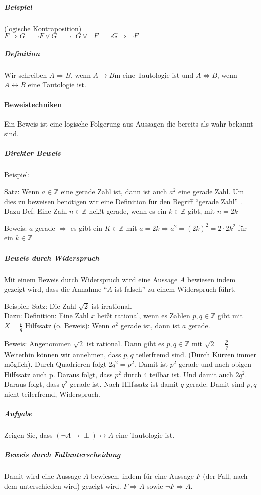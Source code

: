 \documentclass[a4paper]{scrartcl}
\begin{document}
\subparagraph{Beispiel} (logische Kontraposition)\\
$F \Rightarrow G = \neg F \vee G = \neg \neg G \vee \neg F = \neg G \Rightarrow \neg F$

\subparagraph{Definition}
Wir schreiben $A\Rightarrow B$, wenn $A\rightarrow B$m eine Tautologie ist und $A \Leftrightarrow B$, wenn $A\leftrightarrow B$ eine Tautologie ist.


\paragraph{Beweistechniken}
Ein Beweis ist eine logische Folgerung aus Aussagen die bereits als wahr bekannt sind.
\subparagraph{Direkter Beweis}
Beispiel:

Satz: Wenn $a\in \mathbb{Z}$ eine gerade Zahl ist, dann ist auch $a^2$ eine gerade Zahl. Um dies zu beweisen benötigen wir eine Definition für den Begriff "`gerade Zahl"' . Dazu Def:
Eine Zahl $n\in \mathbb{Z}$ heißt gerade, wenn es ein $k \in \mathbb{Z}$ gibt, mit $n=2k$

Beweis:
$a$ gerade $\Rightarrow$ es gibt ein $K \in \mathbb{Z}$ mit $a=2k \Rightarrow a^2 = (2k)^2 = 2 \cdot 2 k^2$ für ein $k \in \mathbb{Z}$

\subparagraph{Beweis durch Widerspruch}

Mit einem Beweis durch Widerspruch wird eine Aussage $A$ bewiesen indem gezeigt wird, dass die Annahme "`$A$ ist falsch"' zu einem Widerspruch führt.

Beispiel: Satz: Die Zahl $\sqrt{2}$ ist irrational.\\
Dazu: Definition: Eine Zahl $x$ heißt rational, wenn es Zahlen $p,q \in \mathbb{Z}$ gibt mit $X=\frac{p}{q}$
Hilfssatz (o. Beweis): Wenn $a^2$ gerade ist, dann ist $a$ gerade.

Beweis: Angenommen $\sqrt{2}$ ist rational. Dann gibt es $p,q \in \mathbb{Z}$ mit $\sqrt{2}=\frac{p}{q}$ Weiterhin können wir annehmen, dass $p,q$ teilerfremd sind. (Durch Kürzen immer möglich). Durch Quadrieren folgt $2q^2 = p^2$. Damit ist $p^2$ gerade und nach obigen Hilfssatz auch p. Daraus folgt, dass $p^2$ durch $4$ teilbar ist. Und damit auch $2q^2$. Daraus folgt, dass $q^2$ gerade ist. Nach Hilfssatz ist damit $q$ gerade. Damit sind $p,q$ nicht teilerfremd, Widerspruch.

\subparagraph{Aufgabe}
Zeigen Sie, dass $(\neg A \rightarrow \perp) \leftrightarrow A$ eine Tautologie ist.

\subparagraph{Beweis durch Fallunterscheidung} Damit wird eine Aussage $A$ bewiesen, indem für eine Aussage $F$ (der Fall, nach dem unterschieden wird) gezeigt wird. $F \Rightarrow A$ sowie $\neg F \Rightarrow A$.
\end{document}
